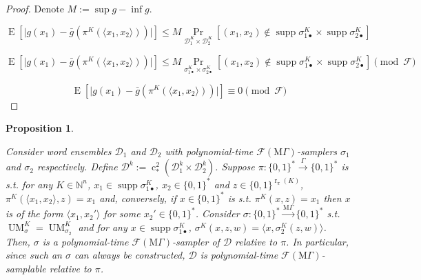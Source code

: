 \documentclass{article}
\numberwithin{equation}{section}
\theoremstyle{definition}
\theoremstyle{plain}
\newtheorem{proposition}{Proposition}[section]
\newcommand{\Bool}{\{0,1\}}
\newcommand{\Words}{{\Bool^*}}
\DeclareMathOperator{\Supp}{supp}
\DeclareMathOperator{\Prb}{Pr}
\DeclareMathOperator{\E}{E}
\DeclareMathOperator{\R}{r}
\DeclareMathOperator{\UM}{UM}
\DeclareMathOperator{\En}{c}
\newcommand{\Nats}{\mathbb{N}}
\newcommand{\Abs}[1]{\lvert #1 \rvert}
\newcommand{\Chev}[1]{\langle #1 \rangle}
\newcommand{\Dist}{\mathcal{D}}
\newcommand{\MGrow}{\mathrm{M}\Gamma}
\newcommand{\Fall}{\mathcal{F}}
\newcommand{\EMG}{\Fall(\MGrow)}
\newcommand{\Scheme}{\xrightarrow{\Gamma}}
\newcommand{\MScheme}{\xrightarrow{\MGrow}}
\begin{document}
\begin{proof}

Denote $M:= \sup g - \inf g$.

$$\E[\Abs{g(x_1)-\bar{g}(\pi^{K}(\Chev{x_1,x_2}))}] \leq M \Prb_{ \Dist_1^{K} \times \Dist_2^{K}}[(x_1,x_2) \not\in \Supp \sigma_{1\bullet}^{K} \times \Supp \sigma_{2\bullet}^{K}]$$

$$\E[\Abs{g(x_1)-\bar{g}(\pi^{K}(\Chev{x_1,x_2}))}] \leq M\Prb_{ \sigma_{1\bullet}^{K} \times \sigma_{2\bullet}^{K}}[(x_1,x_2) \not\in \Supp \sigma_{1\bullet}^{K} \times \Supp \sigma_{2\bullet}^{K}] \pmod \Fall$$

$$\E[\Abs{g(x_1)-\bar{g}(\pi^{K}(\Chev{x_1,x_2}))}] \equiv 0 \pmod \Fall$$
\end{proof}
\begin{samepage}
\begin{proposition}
\label{prp:smp_base_change}

Consider word ensembles $\Dist_1$ and $\Dist_2$ with polynomial-time $\EMG$-samplers $\sigma_1$ and $\sigma_2$ respectively. Define ${\Dist^k:=\En_*^2(\Dist_1^k \times \Dist_2^k)}$. Suppose ${\pi: \Words \Scheme \Words}$ is s.t. for any $K \in \Nats^n$, ${x_1 \in \Supp \sigma_{1\bullet}^{K}}$, ${x_2 \in \Words}$ and $z \in \Bool^{\R_\pi(K)}$, ${\pi^{K}(\Chev{x_1,x_2},z)=x_1}$ and, conversely, if ${x \in \Words}$ is s.t. ${\pi^K(x,z)=x_1}$ then ${x}$ is of the form ${\Chev{x_1,x_2'}}$ for some ${x_2' \in \Words}$. Consider ${\sigma: \Words \MScheme \Words}$ s.t. $\UM_\sigma^{K}=\UM_{\sigma_2}^{K}$ and for any $x \in \Supp \sigma_{1\bullet}^{K}$, ${\sigma^{K}(x,z,w)=\Chev{x,\sigma_2^{K}(z,w)}}$. Then, $\sigma$ is a polynomial-time $\EMG$-sampler of $\Dist$ relative to $\pi$. In particular, since such an $\sigma$ can always be constructed, $\Dist$ is polynomial-time $\EMG$-samplable relative to $\pi$.

\end{proposition}
\end{samepage}
\end{document}
